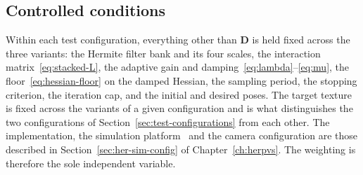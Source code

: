 %
%
%
%

\subsection{Controlled conditions}
\label{sec:ablation-conditions}

Within each test configuration, everything other than $\mathbf{D}$ is held
fixed across the three variants: the Hermite filter bank and its four scales,
the interaction matrix~\eqref{eq:stacked-L}, the adaptive gain and
damping~\eqref{eq:lambda}--\eqref{eq:mu}, the floor~\eqref{eq:hessian-floor}
on the damped Hessian, the sampling period, the stopping criterion, the
iteration cap, and the initial and desired poses. The target texture is fixed
across the variants of a given configuration and is what distinguishes the two
configurations of Section~\ref{sec:test-configurations} from each other.
The implementation, the simulation platform~\cite{key18} and the camera
configuration are those described in Section~\ref{sec:her-sim-config} of
Chapter~\ref{ch:herpvs}. The weighting is therefore the sole independent
variable.


